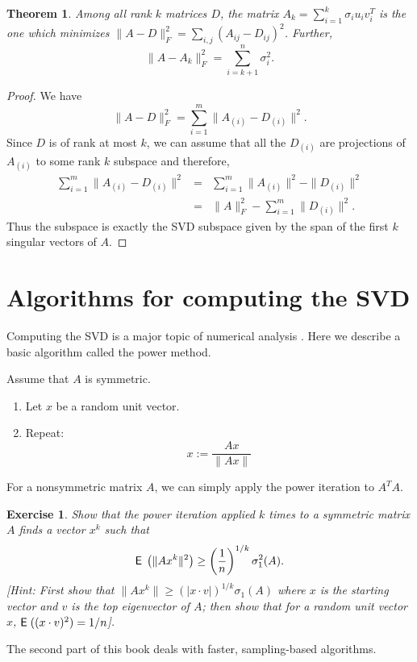 \documentclass{book}
\newtheorem{theorem}{Theorem}[chapter]
\newtheorem{exercise}{Exercise}
\numberwithin{exercise}{chapter}
\begin{document}
\begin{theorem}\label{svdFrob}
Among all rank $k$ matrices $D$, the matrix $A_k = \sum_{i=1}^k
\sigma_i u_i v_i^T $ is the one which minimizes
$\|A-D \|_F^2 = \sum_{i,j} (A_{ij} - D_{ij})^2$. Further,
\[
\|A - A_k\|_F^2 = \sum_{i=k+1}^n \sigma_i^2.
\]
\end{theorem}

\begin{proof}
We have
\[
\|A-D \|_F^2 = \sum_{i=1}^m \|A_{(i)} - D_{(i)}\|^2.
\]
Since $D$ is of rank at most $k$, we can assume that all the $D_{(i)}$ are
projections of $A_{(i)}$ to some rank $k$ subspace and therefore,
\begin{eqnarray*}
\sum_{i=1}^m \|A_{(i)} - D_{(i)}\|^2 &=& \sum_{i=1}^m\|A_{(i)}\|^2 - \|D_{(i)}\|^2\\
&=& \|A\|_F^2 - \sum_{i=1}^m \|D_{(i)}\|^2.
\end{eqnarray*}
Thus the subspace is exactly the SVD subspace given by the span of the first $k$ singular vectors of $A$.
\end{proof}

\section{Algorithms for computing the SVD}

Computing the SVD is a major topic of numerical analysis \cite{Strang, GolubVanLoan, Wilkinson}.
Here we describe a basic algorithm called the power method.

Assume that $A$ is symmetric.
\begin{enumerate}
\item Let $x$ be a random unit vector.
\item Repeat:
\[
x:= \frac{Ax}{\|Ax\|}
\]
\end{enumerate}
For a nonsymmetric matrix $A$, we can simply apply the power iteration to $A^TA$.

\begin{exercise}
Show that the power iteration applied $k$ times to a symmetric matrix $A$ finds a vector $x^k$ such that
\[
\hbox{{\sf E}\;}\left(\|Ax^k\|^2\right) \ge \left(\frac{1}{n}\right)^{1/k} \sigma_1^2(A).
\]
[Hint: First show that $\|Ax^k\| \ge (|x \cdot v|)^{1/k}\sigma_1(A)$ where $x$ is the starting vector and $v$ is the top eigenvector of $A$; then show that for a random unit vector $x$, $\hbox{{\sf E}\;}((x\cdot v)^2)=1/n$].
\end{exercise}

The second part of this book deals with faster, sampling-based algorithms.
\end{document}
